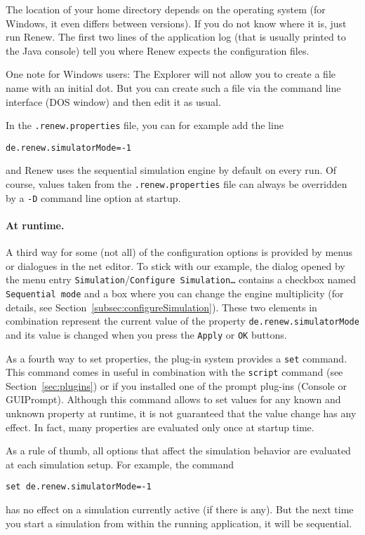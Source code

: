 The location of your home directory depends on the operating system
(for Windows, it even differs between versions).
If you do not know where it is, just run Renew.
The first two lines of the application log (that is usually printed
to the Java console) tell you where Renew
expects the configuration files.

One note for Windows users: The Explorer will not allow you to
create a file name with an initial dot. But you can create such a
file via the command line interface (DOS window) and then edit it
as usual.

In the \texttt{.renew.properties} file, you can for example add the
line
\begin{lstlisting}[style=xnonfloating]
de.renew.simulatorMode=-1
\end{lstlisting}
and Renew uses the sequential simulation engine by default on every 
run.
Of course, values taken from the \texttt{.renew.properties} file can
always be overridden by a \texttt{-D} command line option at startup.

\paragraph{At runtime.}
A third way for some (not all) of the configuration options is
provided by menus or dialogues in the net editor.
To stick with our example, the dialog opened by the menu entry
\texttt{Simulation}/\texttt{Configure Simulation\dots{}}
contains a checkbox named \texttt{Sequential mode} and a box where you
can change the engine multiplicity (for details, see
Section~\ref{subsec:configureSimulation}).
These two elements in combination represent the current value of the
property \texttt{de.renew.simulatorMode} and its value is changed
when you press the \texttt{Apply} or \texttt{OK} buttons.

As a fourth way to set properties, the plug-in system provides a
\texttt{set} command.
This command comes in useful in combination with the \texttt{script}
command (see Section~\ref{sec:plugins}) or if you installed one of the
prompt plug-ins (Console or GUIPrompt).
Although this command allows to set values for any known and unknown
property at runtime, it is not guaranteed that the value change has any effect.
In fact, many properties are evaluated only once at startup time.

As a rule of thumb, all options that affect the simulation behavior
are evaluated at each simulation setup.
For example, the command
\begin{lstlisting}[style=xnonfloating]
set de.renew.simulatorMode=-1
\end{lstlisting}
has no effect on a simulation currently active (if there is any).
But the next time you start a simulation from within the running
application, it will be sequential.

